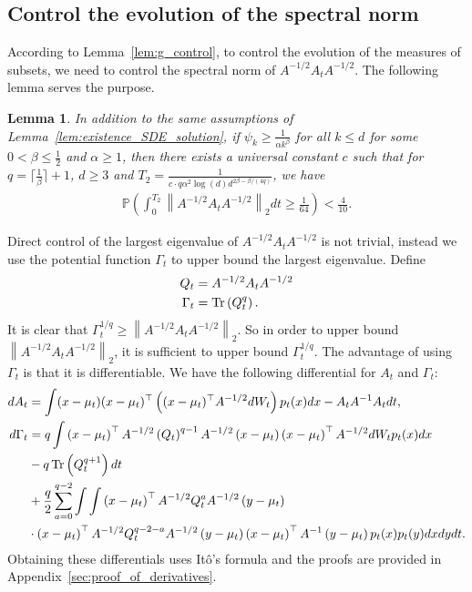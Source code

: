 \documentclass[11pt,twoside]{article}
\newcommand{\isoperi}{\psi}
\newcommand{\co}{A}
\newcommand{\qo}{Q}
\newcommand{\potentwo}{\Gamma}
\theoremstyle{named}
\theoremstyle{plain}
\newtheorem{lemma}{Lemma}
\newcommand{\vecnorm}[2]{\left\| #1\right\|_{#2}}
\newcommand{\Prob}{\ensuremath{{\mathbb{P}}}}
\newcommand{\usedim}{\ensuremath{d}}
\newcommand{\dims}{\usedim}
\DeclareMathOperator{\trace}{Tr}
\newcommand{\parenth}[1]{\left( #1 \right)}
\newcommand{\tp}{^\top}
\begin{document}
\subsection{Control the evolution of the spectral norm} %
\label{sub:control_the_evolution_of_the_spectral norm}
According to Lemma~\ref{lem:g_control}, to control the evolution of the measures of subsets, we need to control the spectral norm of $\co^{-1/2} A_t \co^{-1/2}$. The following lemma serves the purpose.
\begin{lemma}
  \label{lem:isoperi_implies_A_control}
  In addition to the same assumptions of Lemma~\ref{lem:existence_SDE_solution}, if $\isoperi_k \geq \frac{1}{\alpha k^\beta}$ for all $k \leq \dims$ for some $0 < \beta \leq \frac{1}{2}$ and $\alpha \geq 1$, then there exists a universal constant $c$ such that for $q = \lceil \frac{1}{\beta} \rceil + 1$, $\dims \geq 3$ and $T_2 = \frac{1}{ c \cdot q \alpha^2\log(\dims) \dims^{2\beta - \beta/(4q)}}$, we have
  \begin{align*}
    \Prob\parenth{\int_{0}^{T_2} \vecnorm{\co^{-1/2} A_t \co^{-1/2}}{2} dt \geq \frac{1}{64}} < \frac{4}{10}.
  \end{align*}
\end{lemma}
Direct control of the largest eigenvalue of $\co^{-1/2} A_t \co^{-1/2}$ is not trivial, instead we use the potential function $\potentwo_t$ to upper bound the largest eigenvalue.
Define
\begin{align}
  \label{eq:poten2_def}
  \qo_t &= \co^{-1/2} A_t \co^{-1/2} \notag \\
  \potentwo_t &= \trace\parenth{\qo_t^q}.
\end{align}
It is clear that $\potentwo_t^{1/q} \geq \vecnorm{\co^{-1/2} A_t \co^{-1/2}}{2}$. So in order to upper bound $\vecnorm{\co^{-1/2} A_t \co^{-1/2}}{2}$, it is sufficient to upper bound $\potentwo_t^{1/q}$. The advantage of using $\potentwo_t$ is that it is differentiable. We have the following differential for $A_t$ and $\potentwo_t$:
\begin{align}
  \label{eq:known_SDE_change_At}
  dA_t &= \int (x - \mu_t) (x - \mu_t)\tp \parenth{(x-\mu_t)\tp \co^{-1/2}dW_t} p_t(x) dx - A_t\co^{-1}A_t dt, \\
  \label{eq:poten2_derivative}
  d\potentwo_t &=  q \int \parenth{x-\mu_t}\tp \co^{-1/2} \parenth{\qo_t}^{q-1} \co^{-1/2} \parenth{x-\mu_t} \parenth{x-\mu_t}\tp \co^{-1/2} dW_t p_t(x) dx \notag \\
  &- q \trace\parenth{\qo_t^{q+1} } dt \notag \\
  &+ \frac{q}{2} \sum_{a = 0}^{q-2} \int \int \parenth{x-\mu_t}\tp \co^{-1/2} \qo_t^{a} \co^{-1/2} \parenth{y-\mu_t} \notag \\
  &\cdot \parenth{x-\mu_t}\tp \co^{-1/2} \qo_t^{q-2-a} \co^{-1/2} \parenth{y-\mu_t} \parenth{x-\mu_t}\tp \co^{-1} \parenth{y-\mu_t} p_t(x) p_t(y) dx dy dt.
\end{align}
Obtaining these differentials uses It\^o's formula and the proofs are provided in Appendix~\ref{sec:proof_of_derivatives}.
\end{document}
